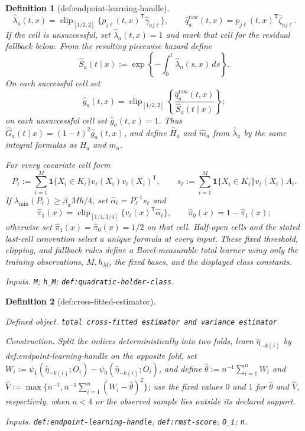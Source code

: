 \documentclass{article}
\newtheorem{definition}{Definition}
\begin{document}
\begin{definition}[def:endpoint-learning-handle]
\[
 \widehat\lambda_a(t,x)=\operatorname{clip}_{[1/2,2]}\{p_{j\ell}(t,x)^{\mathsf T}\widehat\gamma_{aj\ell}\},
 \qquad
 \widehat q_a^{\mathrm{raw}}(t,x)=p_{j\ell}(t,x)^{\mathsf T}\widehat\zeta_{aj\ell}.
\]
If the cell is unsuccessful, set \(\widehat\lambda_a(t,x)=1\) and mark that cell for the residual fallback below.  From the resulting piecewise hazard define
\[
 \widehat S_a(t\mid x):=\exp\!\left\{-\int_0^t\widehat\lambda_a(s,x)\,ds\right\}.
\]
On each successful cell set
\[
 \widehat g_a(t,x)=\operatorname{clip}_{[1/2,2]}\left\{\frac{\widehat q_a^{\mathrm{raw}}(t,x)}{\widehat S_a(t\mid x)}\right\};
\]
on each unsuccessful cell set \(\widehat g_a(t,x)=1\).  Thus \(\widehat G_a(t\mid x)=(1-t)^2\widehat g_a(t,x)\), and define \(\widehat H_a\) and \(\widehat m_a\) from \(\widehat\lambda_a\) by the same integral formulas as \(H_a\) and \(m_a\).

For every covariate cell form
\[
 P_\ell:=\sum_{i=1}^M\mathbf 1\{X_i\in K_\ell\}v_\ell(X_i)v_\ell(X_i)^{\mathsf T},
 \qquad
 s_\ell:=\sum_{i=1}^M\mathbf 1\{X_i\in K_\ell\}v_\ell(X_i)A_i.
\]
If \(\lambda_{\min}(P_\ell)\ge\beta_\pi Mh/4\), set \(\widehat\alpha_\ell=P_\ell^{-1}s_\ell\) and
\[
 \widehat\pi_1(x)=\operatorname{clip}_{[1/4,3/4]}\{v_\ell(x)^{\mathsf T}\widehat\alpha_\ell\},
 \qquad \widehat\pi_0(x)=1-\widehat\pi_1(x);
\]
otherwise set \(\widehat\pi_1(x)=\widehat\pi_0(x)=1/2\) on that cell.  Half-open cells and the stated last-cell convention select a unique formula at every input.  These fixed threshold, clipping, and fallback rules define a Borel-measurable total learner using only the training observations, \(M,h_M\), the fixed bases, and the displayed class constants.
\par\smallskip\noindent\emph{Inputs.} \texttt{M}; \texttt{h\_\allowbreak{}M}; \texttt{def:\allowbreak{}quadratic-\allowbreak{}holder-\allowbreak{}class}.
\end{definition}

\begin{definition}[def:cross-fitted-estimator]\label{def:cross-fitted-estimator}
\par\smallskip\noindent\emph{Defined object.} \texttt{total cross-\allowbreak{}fitted estimator and variance estimator}
\par\smallskip\noindent\emph{Construction.} Split the indices deterministically into two folds, learn \(\widehat\eta_{-k(i)}\) by def:endpoint-learning-handle on the opposite fold, set \(W_i:=\psi_1(\widehat\eta_{-k(i)};O_i)-\psi_0(\widehat\eta_{-k(i)};O_i)\), and define \(\widehat\theta:=n^{-1}\sum_{i=1}^nW_i\) and \(\widehat V:=\max\{n^{-1},n^{-1}\sum_{i=1}^n(W_i-\widehat\theta)^2\}\); use the fixed values \(0\) and \(1\) for \(\widehat\theta\) and \(\widehat V\), respectively, when \(n<4\) or the observed sample lies outside its declared support.
\par\smallskip\noindent\emph{Inputs.} \texttt{def:\allowbreak{}endpoint-\allowbreak{}learning-\allowbreak{}handle}; \texttt{def:\allowbreak{}rmst-\allowbreak{}score}; \texttt{O\_\allowbreak{}i}; \texttt{n}.
\end{definition}
\end{document}
